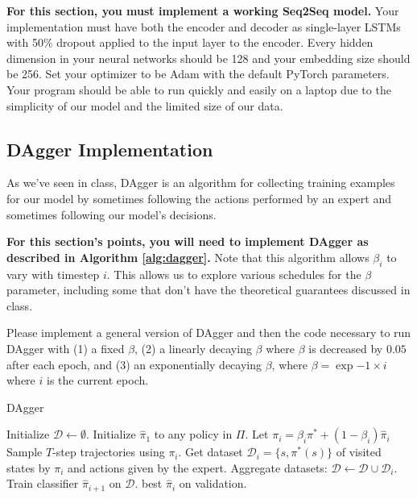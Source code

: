 \documentclass[11pt,addpoints,answers]{exam}
\numberwithin{equation}{section} %
\numberwithin{figure}{section} %
\numberwithin{table}{section} %
\begin{document}
\textbf{For this section,  you must implement a working Seq2Seq model.} Your implementation must have both the encoder and decoder as single-layer LSTMs with 50\% dropout applied to the input layer to the encoder. Every hidden dimension in your neural networks should be 128 and your embedding size should be 256. Set your optimizer to be Adam with the default PyTorch parameters. Your program should be able to run quickly and easily on a laptop due to the simplicity of our model and the limited size of our data.  


\subsection{DAgger Implementation}

As we've seen in class, DAgger is an algorithm for collecting training examples for our model by sometimes following the actions performed by an expert and sometimes following our model's decisions. 

\textbf{For this section's points, you will need to implement DAgger as described in Algorithm \ref{alg:dagger}.} Note that this algorithm allows $\beta_i$ to vary with timestep $i$. This allows us to explore various schedules for the $\beta$ parameter, including some that don't have the theoretical guarantees discussed in class. 

Please implement a general version of DAgger and then the code necessary to run DAgger with (1) a fixed $\beta$, (2) a linearly decaying $\beta$ where $\beta$ is decreased by $0.05$ after each epoch, and (3) an exponentially decaying $\beta$, where $\beta = \exp{-1 \times i}$ where $i$ is the current epoch. 

\begin{algorithm}[H]
\caption{DAgger}
\label{alg:dagger}
\begin{algorithmic}
\STATE Initialize $\mathcal{D} \gets \emptyset$.
\STATE Initialize $\hat{\pi}_1$ to any policy in $\Pi$.
    \STATE Let $\pi_i = \beta_i \pi^* + (1-\beta_i)\hat{\pi}_i$
    \STATE Sample $T$-step trajectories using $\pi_i$.
    \STATE Get dataset $\mathcal{D}_i = \{ s, \pi^*(s)\}$ of visited states by $\pi_i$ and actions given by the expert. 
    \STATE Aggregate datasets: $\mathcal{D} \gets \mathcal{D} \cup \mathcal{D}_i$.
    \STATE Train classifier $\hat{\pi}_{i+1}$ on $\mathcal{D}$.
\ENDFOR
\RETURN best $\hat{\pi}_i$ on validation. 
\end{algorithmic}
\end{algorithm}
\end{document}
